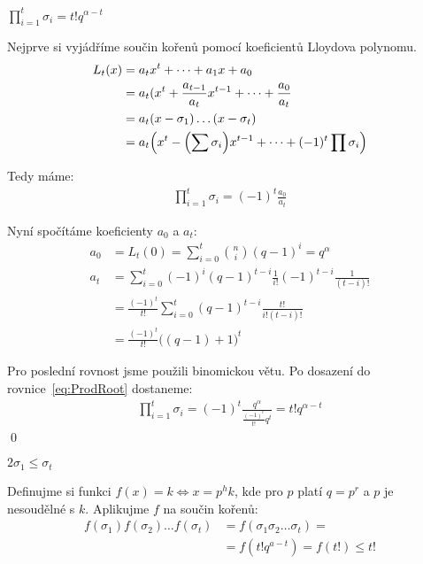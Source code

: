 \lm $\prod\limits_{i = 1}^{t} \sigma_i = t!q^{\alpha - t}$

\dk Nejprve si vyjádříme součin kořenů pomocí koeficientů Lloydova polynomu.
\begin{align*}
L_t(x) &= a_t x^t + \dots + a_1x + a_0 \\
&= a_t (x^t + \frac{a_{t-1}}{a_t}x^{t-1} + \dots + \frac{a_0}{a_t} \\
&= a_t (x - \sigma_1)\dots(x - \sigma_t) \\
&= a_t\Bigl(x^t - \Bigl(\sum \sigma_i\Bigr)x^{t-1} + \dots + (-1)^t \prod \sigma_i\Bigr)
\end{align*}

Tedy máme:
\begin{align}
\prod\limits_{i = 1}^{t} \sigma_i = (-1)^t \frac{a_0}{a_t} \label{eq:ProdRoot}
\end{align}

Nyní spočítáme koeficienty $a_0$ a $a_t$:
\begin{align*}
a_0 &= L_t(0) = \sum\limits_{i = 0}^{t} {n \choose i}(q - 1)^i = q^\alpha \\
a_t &= \sum\limits_{i = 0}^{t} (-1)^i (q - 1)^{t - i} \frac{1}{i!}(-1)^{t-i} \frac{1}{(t-i)!} \\
&= \frac{(-1)^t}{t!}\sum\limits_{i = 0}^{t}(q-1)^{t-i} \frac{t!}{i!(t-i)!} \\
&= \frac{(-1)^t}{t!}\bigl((q - 1) + 1\bigr)^t
\end{align*}

Pro poslední rovnost jsme použili binomickou větu. Po dosazení do rovnice~\ref{eq:ProdRoot} dostaneme:
\begin{align*}
\prod\limits_{i = 1}^{t} \sigma_i = (-1)^t \frac{q^\alpha}{\frac{(-1)^t}{t!}q^t} = t!q^{\alpha-t}
\end{align*}
\qed

\lm $2 \sigma_1 \leq \sigma_t$

\dk Definujme si funkci $f(x) = k \Leftrightarrow x = p^hk$, kde pro $p$ platí $q = p^r$ a $p$ je nesoudělné s $k$. Aplikujme $f$ na součin kořenů:
\begin{align*}
f(\sigma_1)f(\sigma_2) \dots f(\sigma_t) &= f(\sigma_1\sigma_2 \dots \sigma_t) =\\
&= f(t!q^{a-t}) = f(t!) \leq t!
\end{align*}

